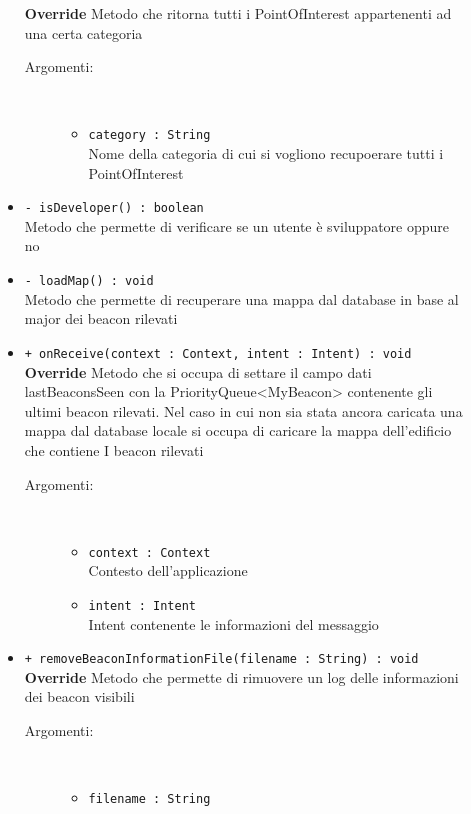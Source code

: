 \documentclass[../DefinizioneDiProdotto.tex]{subfiles}
\begin{document}
\begin{description}
\begin{itemize}
		\textbf{Override} Metodo che ritorna tutti i PointOfInterest appartenenti ad una certa categoria
		\begin{description}
			\item[Argomenti:] \
			\begin{itemize}
				\item \texttt{category : String}\\
				Nome della categoria di cui si vogliono recupoerare tutti i PointOfInterest\end{itemize}
		\end{description}
		\item \texttt{- isDeveloper() : boolean}\\
		Metodo che permette di verificare se un utente è sviluppatore oppure no
		\item \texttt{- loadMap() : void}\\
		Metodo che permette di recuperare una mappa dal database in base al major dei beacon rilevati
		\item \texttt{+ onReceive(context : Context, intent : Intent) : void}\\
		\textbf{Override} Metodo che si occupa di settare il campo dati lastBeaconsSeen con la PriorityQueue<MyBeacon> contenente gli ultimi beacon rilevati. Nel caso in cui non sia stata ancora caricata una mappa dal database locale si occupa di caricare la mappa dell'edificio che contiene I beacon rilevati
		\begin{description}
			\item[Argomenti:] \
			\begin{itemize}
				\item \texttt{context : Context}\\
				Contesto dell'applicazione\item \texttt{intent : Intent}\\
				Intent contenente le informazioni del messaggio\end{itemize}
		\end{description}
		\item \texttt{+ removeBeaconInformationFile(filename : String) : void}\\
		\textbf{Override} Metodo che permette di rimuovere un log delle informazioni dei beacon visibili
		\begin{description}
			\item[Argomenti:] \
			\begin{itemize}
				\item \texttt{filename : String}\\

\end{itemize}
\end{description}
\end{itemize}
\end{description}
\end{document}
